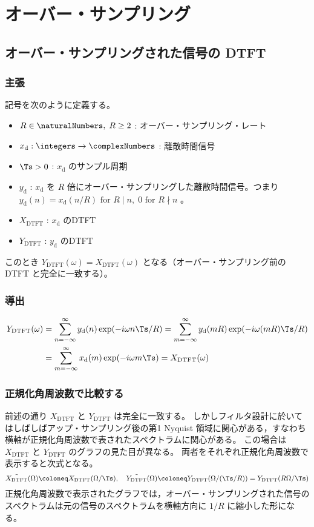 \chapter{オーバー・サンプリング}
    \section{オーバー・サンプリングされた信号の DTFT}
        \label{オーバー・サンプリングされた信号の DTFT}
        \newcommand*{\xd}{x_\text{d}}
        \newcommand*{\yd}{y_\text{d}}
        \newcommand*{\XDTFT}{X_\text{DTFT}}
        \newcommand*{\YDTFT}{Y_\text{DTFT}}
        \subsection{主張}
            記号を次のように定義する。
            \begin{itemize}
                \item $R\in\naturalNumbers,\;R\geq 2$ : オーバー・サンプリング・レート
                \item $\xd:\integers\to\complexNumbers$ : 離散時間信号
                \item $\Ts>0$ : $\xd$ のサンプル周期
                \item $\yd$ : $\xd$ を $R$ 倍にオーバー・サンプリングした離散時間信号。つまり $\yd(n) = \xd(n/R)\text{ for }R\mid n,\;0\text{ for }R\nmid n$ 。
                \item $\XDTFT$ : $\xd$ のDTFT
                \item $\YDTFT$ : $\yd$ のDTFT
            \end{itemize}
            このとき $\YDTFT(\omega) = \XDTFT(\omega)$ となる（オーバー・サンプリング前の DTFT と完全に一致する）。
        \subsection{導出}
            \begin{align*}
                \YDTFT(\omega) &= \sum_{n=-\infty}^\infty \yd(n)\exp(-i\omega n\Ts/R) = \sum_{m=-\infty}^\infty \yd(mR)\exp(-i\omega (mR)\Ts/R) \\
                &= \sum_{m=-\infty}^\infty \xd(m)\exp(-i\omega m\Ts) = \XDTFT(\omega)
            \end{align*}
        \subsection{正規化角周波数で比較する}
            前述の通り $\XDTFT$ と $\YDTFT$ は完全に一致する。
            しかしフィルタ設計に於いてはしばしばアップ・サンプリング後の第1 Nyquist 領域に関心がある，すなわち横軸が正規化角周波数で表されたスペクトラムに関心がある。
            この場合は $\XDTFT$ と $\YDTFT$ のグラフの見た目が異なる。
            両者をそれぞれ正規化角周波数で表示すると次式となる。
            \[ \tilde{\XDTFT}(\Omega) \coloneq \XDTFT(\Omega/\Ts),\quad \tilde{\YDTFT}(\Omega) \coloneq \YDTFT(\Omega/(\Ts/R)) = \YDTFT(R\Omega/\Ts) \]
            正規化角周波数で表示されたグラフでは，オーバー・サンプリングされた信号のスペクトラムは元の信号のスペクトラムを横軸方向に $1/R$ に縮小した形になる。
